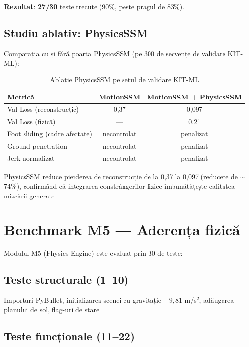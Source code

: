 \textbf{Rezultat}: \textbf{27/30} teste trecute (90\%, peste pragul de 83\%).

\subsection{Studiu ablativ: PhysicsSSM}

Comparația cu și fără poarta PhysicsSSM (pe 300 de secvențe de validare KIT-ML):

\begin{table}[h]
\centering
\begin{tabular}{l c c}
\hline
\textbf{Metrică} & \textbf{MotionSSM} & \textbf{MotionSSM + PhysicsSSM} \\
\hline
Val Loss (reconstrucție) & 0,37 & 0,097 \\
Val Loss (fizică) & --- & 0,21 \\
Foot sliding (cadre afectate) & necontrolat & penalizat \\
Ground penetration & necontrolat & penalizat \\
Jerk normalizat & necontrolat & penalizat \\
\hline
\end{tabular}
\caption{Ablație PhysicsSSM pe setul de validare KIT-ML}
\label{tab:ablation}
\end{table}

PhysicsSSM reduce pierderea de reconstrucție de la 0,37 la 0,097 (reducere de $\sim$74\%), confirmând că integrarea constrângerilor fizice îmbunătățește calitatea mișcării generate.

\section{Benchmark M5 --- Aderența fizică}
\label{sec:bench_m5}

Modulul M5 (Physics Engine) este evaluat prin 30 de teste:

\subsection{Teste structurale (1--10)}

Importuri PyBullet, inițializarea scenei cu gravitație $-9{,}81$ m/s$^2$, adăugarea planului de sol, flag-uri de stare.

\subsection{Teste funcționale (11--22)}

